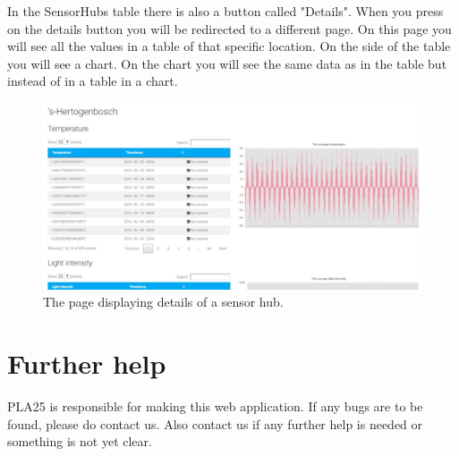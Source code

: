 \documentclass[a4paper]{article}
\begin{document}
\newpage
In the SensorHubs table there is also a button called "Details". When you press on the details button you will be redirected to a different page. On this page you will see all the values in a table of that specific location. On the side of the table you will see a chart. On the chart you will see the same data as in the table but instead of in a table in a chart.
\begin{figure}[h!]
  \caption{The page displaying details of a sensor hub.}
  \centering
  \includegraphics[width=1\textwidth]{admin-details}
\end{figure}

\newpage
\section{Further help}
PLA25 is responsible for making this web application. If any bugs are to be found, please do contact us.
Also contact us if any further help is needed or something is not yet clear.
\end{document}
